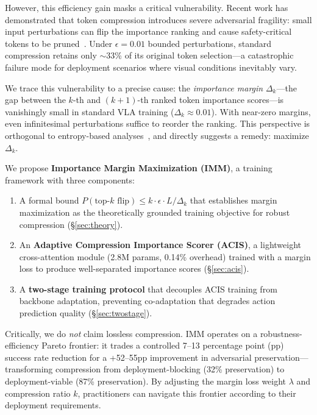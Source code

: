 \documentclass[10pt,twocolumn]{article}
\begin{document}
However, this efficiency gain masks a critical vulnerability. Recent work has demonstrated that token compression introduces severe adversarial fragility: small input perturbations can flip the importance ranking and cause safety-critical tokens to be pruned~\cite{lessismore2025,cage2026}. Under $\epsilon{=}0.01$ bounded perturbations, standard compression retains only $\sim$33\% of its original token selection---a catastrophic failure mode for deployment scenarios where visual conditions inevitably vary.

We trace this vulnerability to a precise cause: the \emph{importance margin} $\Delta_k$---the gap between the $k$-th and $(k{+}1)$-th ranked token importance scores---is vanishingly small in standard VLA training ($\Delta_k \approx 0.01$). With near-zero margins, even infinitesimal perturbations suffice to reorder the ranking. This perspective is orthogonal to entropy-based analyses~\cite{adl2023iccv}, and directly suggests a remedy: maximize $\Delta_k$.

We propose \textbf{Importance Margin Maximization (IMM)}, a training framework with three components:

\begin{enumerate}
    \item A formal bound $P(\text{top-}k \text{ flip}) \leq k \cdot \epsilon \cdot L / \Delta_k$ that establishes margin maximization as the theoretically grounded training objective for robust compression (\S\ref{sec:theory}).
    \item An \textbf{Adaptive Compression Importance Scorer (ACIS)}, a lightweight cross-attention module (2.8M params, 0.14\% overhead) trained with a margin loss to produce well-separated importance scores (\S\ref{sec:acis}).
    \item A \textbf{two-stage training protocol} that decouples ACIS training from backbone adaptation, preventing co-adaptation that degrades action prediction quality (\S\ref{sec:twostage}).
\end{enumerate}

Critically, we do \emph{not} claim lossless compression. IMM operates on a robustness-efficiency Pareto frontier: it trades a controlled 7--13 percentage point (pp) success rate reduction for a +52--55pp improvement in adversarial preservation---transforming compression from deployment-blocking (32\% preservation) to deployment-viable (87\% preservation). By adjusting the margin loss weight $\lambda$ and compression ratio $k$, practitioners can navigate this frontier according to their deployment requirements.
\end{document}
